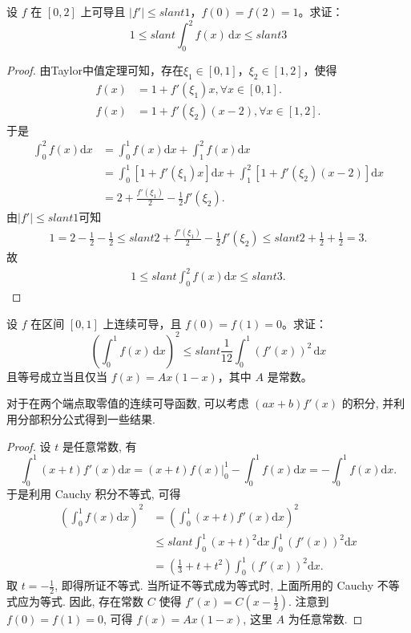 \documentclass[../../main.tex]{subfiles}
\begin{document}
\begin{example}
设 \( f \) 在 \([0,2]\) 上可导且 \(|f'| \leqslant slant 1\)，\( f(0) = f(2) = 1 \)。求证：
\[
1 \leqslant slant \int_{0}^{2} f(x) \, \mathrm{d}x \leqslant slant 3
\]
\end{example}
\begin{proof}
由Taylor中值定理可知，存在$\xi_1\in[0,1]$，$\xi_2\in[1,2]$，使得
\begin{align*}
f(x)&=1+f'(\xi_1)x,\forall x\in[0,1].\\
f(x)&=1+f'(\xi_2)(x-2),\forall x\in[1,2].
\end{align*}
于是
\begin{align*}
\int_0^2 f(x)\mathrm{d}x&=\int_0^1 f(x)\mathrm{d}x+\int_1^2 f(x)\mathrm{d}x\\
&=\int_0^1 [1+f'(\xi_1)x]\mathrm{d}x+\int_1^2 [1+f'(\xi_2)(x-2)]\mathrm{d}x\\
&=2+\frac{f'(\xi_1)}{2}-\frac{1}{2}f'(\xi_2).
\end{align*}
由$|f'|\leqslant slant1$可知
\begin{align*}
1=2-\frac{1}{2}-\frac{1}{2}\leqslant slant 2+\frac{f'(\xi_1)}{2}-\frac{1}{2}f'(\xi_2)\leqslant slant 2+\frac{1}{2}+\frac{1}{2}=3.
\end{align*}
故
\begin{align*}
1\leqslant slant \int_0^2 f(x)\mathrm{d}x\leqslant slant 3.
\end{align*}
\end{proof}

\begin{example}
设 \( f \) 在区间 \([0,1]\) 上连续可导，且 \( f(0) = f(1) = 0 \)。求证：
\[
\left( \int_{0}^{1} f(x) \, \mathrm{d}x \right)^{2} \leqslant slant \frac{1}{12} \int_{0}^{1} \left( f'(x) \right)^{2} \, \mathrm{d}x
\]
且等号成立当且仅当 \( f(x) = Ax(1 - x) \)，其中 \( A \) 是常数。
\end{example}
\begin{note}
对于在两个端点取零值的连续可导函数, 可以考虑 \((ax + b)f'(x)\) 的积分, 并利用分部积分公式得到一些结果.
\end{note}
\begin{proof}
设 \(t\) 是任意常数, 有
\[
\int_0^1 (x + t)f'(x)\mathrm{d}x = (x + t)f(x) \Big|_0^1 - \int_0^1 f(x)\mathrm{d}x = -\int_0^1 f(x)\mathrm{d}x.
\]
于是利用 Cauchy 积分不等式, 可得
\begin{align*}
\left(\int_0^1 f(x)\mathrm{d}x\right)^2 &= \left(\int_0^1 (x + t)f'(x)\mathrm{d}x\right)^2\\
&\leqslant slant \int_0^1 (x + t)^2\mathrm{d}x \int_0^1 (f'(x))^2\mathrm{d}x\\
&= \left(\frac{1}{3} + t + t^2\right)\int_0^1 (f'(x))^2\mathrm{d}x.
\end{align*}
取 \(t = -\frac{1}{2}\), 即得所证不等式. 当所证不等式成为等式时, 上面所用的 Cauchy 不等式应为等式. 因此, 存在常数 \(C\) 使得 \(f'(x) = C\left(x - \frac{1}{2}\right)\). 注意到 \(f(0) = f(1) = 0\), 可得 \(f(x) = Ax(1 - x)\), 这里 \(A\) 为任意常数.
\end{proof}
\end{document}
